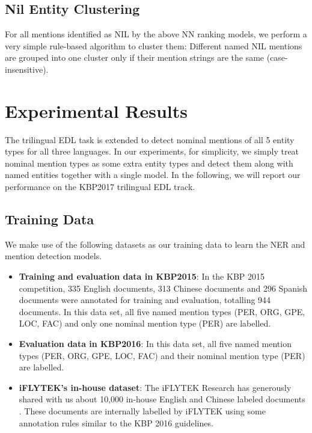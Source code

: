 \documentclass[11pt]{article}
\begin{document}
\subsection{Nil Entity Clustering}

For all mentions identified as NIL by the above NN ranking models, we perform a very simple
rule-based algorithm to cluster them: Different named NIL mentions are grouped into one cluster
only if their mention strings are the same (case-insensitive).

\section{Experimental Results}

The trilingual EDL task is extended to detect nominal mentions of all 5 entity types for all three languages. In our experiments, for simplicity, we simply treat nominal mention types as some extra entity types and detect them along with named entities together with a single model.  
In the following, we will report our performance on the KBP2017  trilingual EDL track. 

\subsection{Training Data}

We make use of the following datasets as our training data to learn the NER and mention detection models. 

\begin{itemize}
	\item \textbf{Training and evaluation data in KBP2015}: In the KBP 2015 competition, 335 English documents, 313 Chinese documents and 296 Spanish documents were annotated for training and evaluation, totalling 944 documents. In this data set, all five named mention types (PER, ORG, GPE, LOC, FAC) and only one nominal mention type (PER) are labelled. 
	
	\item \textbf{Evaluation data in KBP2016}: In this data set, all five named mention types (PER, ORG, GPE, LOC, FAC) and their nominal mention type (PER) are labelled. 
	
	\item \textbf{iFLYTEK's in-house dataset}: The iFLYTEK Research has generously shared with us about 10,000 in-house English and Chinese labeled documents \cite{kbp2016iflytek}.  These documents are internally labelled by iFLYTEK using some annotation rules similar to the KBP 2016 guidelines.
	
\end{itemize}
\end{document}
